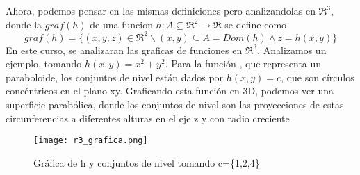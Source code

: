 Ahora, podemos pensar en las mismas definiciones pero analizandolas en $\Re^{3}$, donde la $graf (h)$ de una funcion $h: A\subseteq\Re^{2}\rightarrow\Re$ se define como
 \[
graf(h)=\{(x,y,z)\in\Re^2 \backslash (x,y)\subseteq A=Dom(h) \land z=h(x,y) \}
 \]
En este curso, se analizaran las graficas de funciones en  $\Re^{3}$. Analizamos un ejemplo, tomando $h(x,y)=x^2+y^2$.
Para la función , que representa un paraboloide, los conjuntos de nivel están dados por $h(x,y)=c$, que son círculos concéntricos en el plano xy. Graficando esta función en 3D, podemos ver una superficie parabólica, donde los conjuntos de nivel son las proyecciones de estas circunferencias a diferentes alturas en el eje z y con radio creciente.
\begin{figure}[h!] %
    \centering
    \texttt{[image: r3\_grafica.png]} %
    \caption{\small{ Gráfica de h y conjuntos de nivel tomando 
    c=\{1,2,4}\}}
    \label{fig:ejemplo} %
\end{figure}

